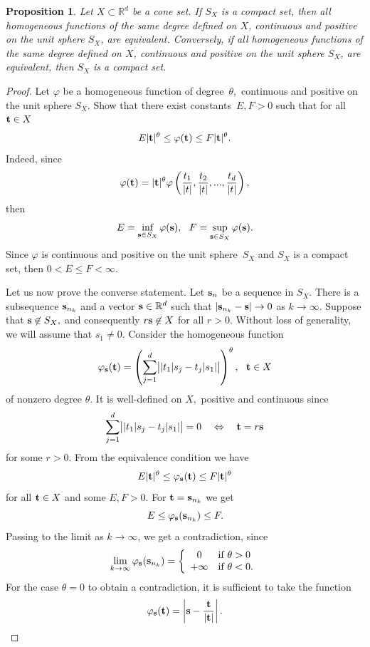 \documentclass[12pt]{article}
\newtheorem{proposition}{Proposition}
\begin{document}
\begin{proposition}\label{ProposSubHomogeneous}
Let $X\subset\mathbb{R}^d$ be a cone set. If $S_X$ is a compact set, then all homogeneous functions of the same degree defined on $X$, continuous and positive on the unit sphere $S_X$, are equivalent. Conversely, if all homogeneous functions of the same degree defined on $X$, continuous and positive on the unit sphere $S_X$, are equivalent, then $S_X$ is a compact set.
\end{proposition}

\begin{proof}
Let $\varphi$ be a homogeneous function of degree~$\theta,$ continuous and positive on the unit sphere $S_X$. Show that there exist constants~${E,F>0}$ such that for all ${{\bf t}\in X}$
$$
E|{\bf t}|^{\theta}\leq\varphi({\bf t})\leq F|{\bf t}|^{\theta}.
$$
Indeed, since
$$
\varphi({\bf t})=|{\bf t}|^\theta\varphi\left(\frac{t_1}{|t|},\frac{t_2}{|t|},...,\frac{t_d}{|t|}\right),
$$
then
$$
E=\inf\limits_{{\bf s}\in S_X}\varphi({\bf s}),\ \ F=\sup\limits_{{\bf s}\in S_X}\varphi({\bf s}).
$$
Since $\varphi$ is continuous and positive on the unit sphere~$S_X$ and $S_X$ is a compact set, then ${0<E\leq F<\infty}.$

Let us now prove the converse statement. Let ${\bf s}_n$ be a sequence in $S_X.$ There is a subsequence ${\bf s}_{n_k}$ and a vector ${\bf s}\in\mathbb{R}^d$ such that ${|{\bf s}_{n_k}-{\bf s}|\to0}$ as ${k\to\infty}.$ Suppose that ${{\bf s}\not\in S_X},$ and consequently ${r{\bf s}\not\in X}$ for all $r>0.$ 
Without loss of generality, we will assume that ${s_1\neq0}.$
Consider the homogeneous function
$$
\varphi_{\bf s}({\bf t})=\left(\sum_{j=1}^d\bigl||t_1|s_j-t_j|s_1|\bigr|\right)^\theta,\ \ {\bf t}\in X
$$
of nonzero degree $\theta.$ It is well-defined on $X,$ positive and continuous since 
$$
\sum_{j=1}^d\bigl||t_1|s_j-t_j|s_1|\bigr|=0\ \ \ \Leftrightarrow\ \ \ {\bf t}=r{\bf s}
$$
for some $r>0.$
From the equivalence condition we have 
$$
E|{\bf t}|^{\theta}\leq\varphi_{\bf s}({\bf t})\leq F|{\bf t}|^{\theta}
$$
for all ${\bf t}\in X$ and some $E,F>0.$ For ${\bf t}={\bf s}_{n_k}$ we get
$$
E\leq\varphi_{\bf s}({\bf s}_{n_k})\leq F.
$$
Passing to the limit as $k\to\infty$, we get a contradiction, since
$$
\lim_{k\to\infty}\varphi_{\bf s}({\bf s}_{n_k})=
\left\{\begin{array}{cl}
0& \text{if}\ \theta>0\\
+\infty& \text{if}\ \theta<0.
\end{array}\right.
$$
For the case ${\theta=0}$ to obtain a contradiction, it is sufficient to take the function
$$
\varphi_{\bf s}(\bf t)=\left|{\bf s}-\frac{\bf t}{|\bf t|}\right|.
$$
\end{proof}
\end{document}
